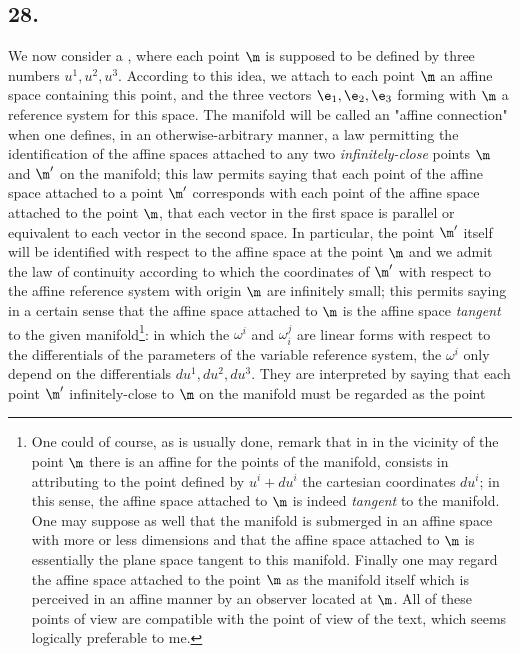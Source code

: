 \subsection*{28.}

We now consider a , where each point $\m$ is supposed to be defined by three numbers $u^1, u^2, u^3$. According to this idea, we attach to each point $\m$ an affine space containing this point, and the three vectors $\e_1, \e_2, \e_3$ forming with $\m$ a reference system for this space. The manifold will be called an "affine connection" when one defines, in an otherwise-arbitrary manner, a law permitting the identification of the affine spaces attached to any two \textit{infinitely-close} points $\m$ and $\m'$ on the manifold; this law permits saying that each point of the affine space attached to a point $\m'$ corresponds with each point of the affine space attached to the point $\m$, that each vector in the first space is parallel or equivalent to each vector in the second space. In particular, the point $\m'$ itself will be identified with respect to the affine space at the point $\m$ and we admit the law of continuity according to which the coordinates of $\m'$ with respect to the affine reference system with origin $\m$ are infinitely small; this permits saying in a certain sense that the affine space attached to $\m$ is the affine space \textit{tangent} to the given manifold\footnote{One could of course, as is usually done, remark that in in the vicinity of the point $\m$ there is an affine  for the points of the manifold,  consists in attributing to the point defined by $u^i + du^i$ the cartesian coordinates $du^i$; in this sense, the affine space attached to $\m$ is indeed \textit{tangent} to the manifold. One may suppose as well that the manifold is submerged in an affine space with more or less dimensions and that the affine space attached to $\m$ is essentially the plane space tangent to this manifold. Finally one may regard the affine space attached to the point $\m$ as the manifold itself which is perceived in an affine manner by an observer located at $\m$. All of these points of view are compatible with the point of view of the text, which seems logically preferable to me.}:
in which the $\omega^i$ and $\omega_i^j$ are linear forms with respect to the differentials of the parameters of the variable reference system, the $\omega^i$ only depend on the differentials $du^1, du^2, du^3$. They are interpreted by saying that each point $\m'$ infinitely-close to $\m$ on the manifold must be regarded as the point

